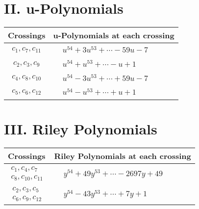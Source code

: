 \documentclass[1p]{elsarticle_modified}
\theoremstyle{definition}
\begin{document}
\newpage\renewcommand{\arraystretch}{1}
\centering \section*{ II. u-Polynomials}
\begin{tabular}{m{50pt}|m{274pt}}
Crossings & \hspace{64pt}u-Polynomials at each crossing \\
\hline $$\begin{aligned}c_{1},c_{7},c_{11}\end{aligned}$$&$\begin{aligned}
&u^{54}+3 u^{53}+\cdots-59 u-7
\end{aligned}$\\
\hline $$\begin{aligned}c_{2},c_{3},c_{9}\end{aligned}$$&$\begin{aligned}
&u^{54}+u^{53}+\cdots- u+1
\end{aligned}$\\
\hline $$\begin{aligned}c_{4},c_{8},c_{10}\end{aligned}$$&$\begin{aligned}
&u^{54}-3 u^{53}+\cdots+59 u-7
\end{aligned}$\\
\hline $$\begin{aligned}c_{5},c_{6},c_{12}\end{aligned}$$&$\begin{aligned}
&u^{54}- u^{53}+\cdots+u+1
\end{aligned}$\\
\hline
\end{tabular}\newpage\renewcommand{\arraystretch}{1}
\centering \section*{ III. Riley Polynomials}
\begin{tabular}{m{50pt}|m{274pt}}
Crossings & \hspace{64pt}Riley Polynomials at each crossing \\
\hline $$\begin{aligned}c_{1},c_{4},c_{7}\\c_{8},c_{10},c_{11}\end{aligned}$$&$\begin{aligned}
&y^{54}+49 y^{53}+\cdots-2697 y+49
\end{aligned}$\\
\hline $$\begin{aligned}c_{2},c_{3},c_{5}\\c_{6},c_{9},c_{12}\end{aligned}$$&$\begin{aligned}
&y^{54}-43 y^{53}+\cdots+7 y+1
\end{aligned}$\\
\hline
\end{tabular}
\vskip 2pc
\end{document}
